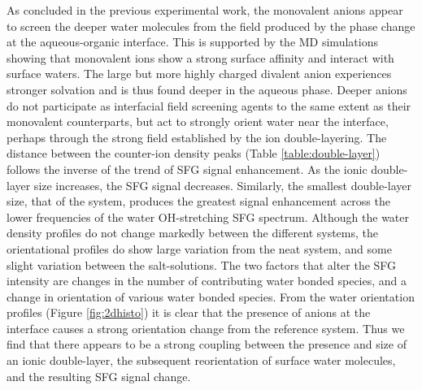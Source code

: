 As concluded in the previous experimental work, the monovalent anions appear to screen the deeper water molecules from the field produced by the phase change at the aqueous-organic interface. This is supported by the MD simulations showing that monovalent ions show a strong surface affinity and interact with surface waters. The large but more highly charged divalent \sul anion experiences stronger solvation and is thus found deeper in the aqueous phase. Deeper anions do not participate as interfacial field screening agents to the same extent as their monovalent counterparts, but act to strongly orient water near the interface, perhaps through the strong field established by the ion double-layering. The distance between the counter-ion density peaks (Table \ref{table:double-layer}) follows the inverse of the trend of SFG signal enhancement. As the ionic double-layer size increases, the SFG signal decreases. Similarly, the smallest double-layer size, that of the \sul system, produces the greatest signal enhancement across the lower frequencies of the water OH-stretching SFG spectrum. Although the water density profiles do not change markedly between the different systems, the orientational profiles do show large variation from the neat \ctcwat system, and some slight variation between the salt-solutions. The two factors that alter the SFG intensity are changes in the number of contributing water bonded species, and a change in orientation of various water bonded species. From the water orientation profiles (Figure \ref{fig:2dhisto}) it is clear that the presence of anions at the \ctcwat interface causes a strong orientation change from the reference \ctcwat system. Thus we find that there appears to be a strong coupling between the presence and size of an ionic double-layer, the subsequent reorientation of surface water molecules, and the resulting SFG signal change.
